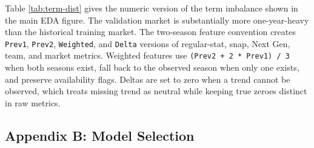 \documentclass[
  10pt,
]{article}
\begin{document}
Table \ref{tab:term-dist} gives the numeric version of the term imbalance shown in the main EDA figure. The validation market is substantially more one-year-heavy than the historical training market. The two-season feature convention creates \texttt{Prev1}, \texttt{Prev2}, \texttt{Weighted}, and \texttt{Delta} versions of regular-stat, snap, Next Gen, team, and market metrics. Weighted features use \texttt{(Prev2\ +\ 2\ *\ Prev1)\ /\ 3} when both seasons exist, fall back to the observed season when only one exists, and preserve availability flags. Deltas are set to zero when a trend cannot be observed, which treats missing trend as neutral while keeping true zeroes distinct in raw metrics.

\subsection{Appendix B: Model Selection}\label{appendix-b-model-selection}

\begin{table}[H]
\centering
\caption{\label{tab:recipe-table}\label{tab:recipe} Modeling preprocessing and leakage controls.}
\centering
{}
\end{table}
\end{document}
